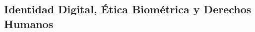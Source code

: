 \begin{refsection}
\chapter{Identidad Digital, Ética Biométrica y Derechos Humanos}
\label{chapter:chapter-8}


\begin{comment}
\begin{enumerate}
\item \textbf{Identidad Digital, Ética Biométrica y Derechos Humanos (Capítulo 8):}  
\begin{itemize}
    \item Análisis de tecnologías biométricas y sistemas de identidad digital.
    \item Implicaciones éticas de la vigilancia masiva y el reconocimiento facial.
    \item Propuestas para proteger los derechos humanos con herramientas descentralizadas.
    \item Actividad: Crear un prototipo de sistema de anonimización de datos biométricos con Python.
\end{itemize}
\end{enumerate}
\end{comment}


\nocite{*}

\printbibliography[heading=subbibliography, title={Bibliografía del Capítulo 8}]
\end{refsection}
